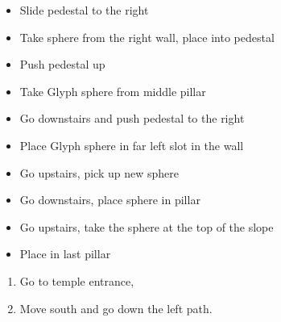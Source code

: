 \begin{trial}
	\begin{itemize}
		\item Slide pedestal to the right
		\item Take sphere from the right wall, place into pedestal
		\item Push pedestal up
		\item Take Glyph sphere from middle pillar
		\item Go downstairs and push pedestal to the right
		\item Place Glyph sphere in far left slot in the wall
		\item Go upstairs, pick up new sphere
		\item Go downstairs, place sphere in pillar
		\item Go upstairs, take the sphere at the top of the slope
		\item Place in last pillar
	\end{itemize}
\end{trial}
\begin{enumerate}[resume]
	\item Go to temple entrance, \sd
	\item Move south and go down the left path.
\end{enumerate}
